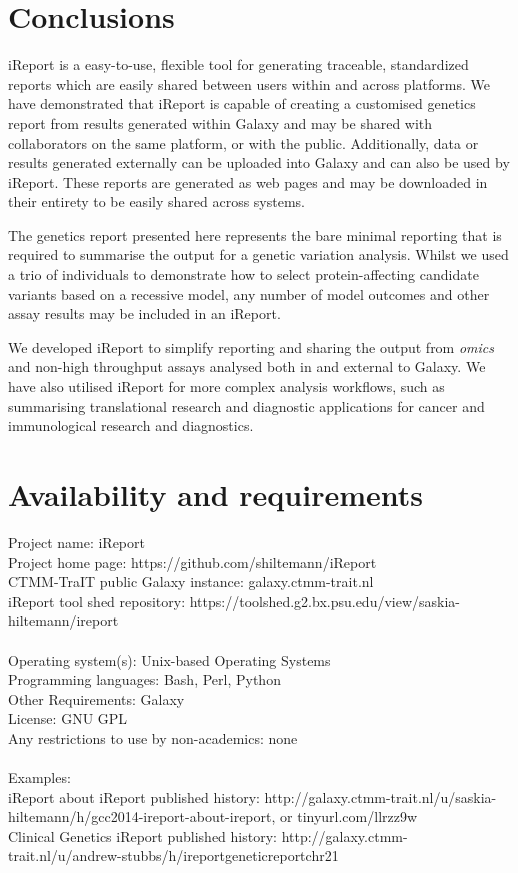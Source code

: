 \section*{Conclusions}
iReport is a easy-to-use, flexible tool for generating traceable, standardized reports which are easily shared between users within and across platforms. We have demonstrated that iReport is capable of creating a customised genetics report from results generated within Galaxy and may be shared with collaborators on the same platform, or with the public. Additionally, data or results generated externally can be uploaded into Galaxy and can also be used by iReport. These reports are generated as web pages and may be downloaded in their entirety to be easily shared across systems.

The genetics report presented here represents the bare minimal reporting that is required to summarise the output for a genetic variation analysis. Whilst we used a trio of individuals to demonstrate how to select protein-affecting candidate variants based on a recessive model, any number of model outcomes and other assay results may be included in an iReport.

We developed iReport to simplify reporting and sharing the output from \emph{omics} and non-high throughput assays analysed both in and external to Galaxy. We have also utilised iReport for more complex analysis workflows, such as summarising translational research and diagnostic applications for cancer and immunological research and diagnostics.

\section*{Availability and requirements}
Project name: iReport \\
Project home page: https://github.com/shiltemann/iReport \\
CTMM-TraIT public Galaxy instance: galaxy.ctmm-trait.nl \\
iReport tool shed repository: https://toolshed.g2.bx.psu.edu/view/saskia-hiltemann/ireport \\
\ \\
Operating system(s): Unix-based Operating Systems \\
Programming languages: Bash, Perl, Python \\
Other Requirements: Galaxy \\
License: GNU GPL \\
Any restrictions to use by non-academics: none \\
\ \\
Examples: \\
iReport about iReport published history: http://galaxy.ctmm-trait.nl/u/saskia-hiltemann/h/gcc2014-ireport-about-ireport, or tinyurl.com/llrzz9w \\
Clinical Genetics iReport published history: http://galaxy.ctmm-trait.nl/u/andrew-stubbs/h/ireportgeneticreportchr21 \\


